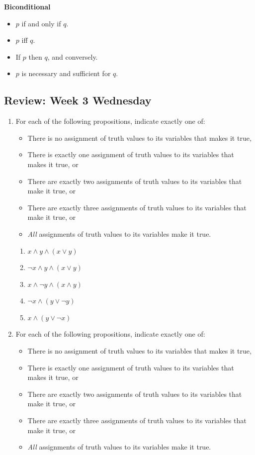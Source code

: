 \documentclass[12pt, oneside]{article}
\begin{document}
{\bf Biconditional}
\begin{itemize}
    \item $p$ if and only if $q$.
    \item $p$ iff $q$.
    \item If $p$ then $q$, and conversely.
    \item $p$ is necessary and sufficient for $q$.
\end{itemize} \newpage
\subsection*{Review: Week 3 Wednesday}
\begin{enumerate}
    \item 

For each of the following propositions, indicate exactly one of:

\begin{itemize}
    \item There is no assignment of truth values to its variables that makes it true,
    \item There is exactly one assignment of truth values to its variables that makes it true, or
    \item There are exactly two assignments of truth values to its variables that make it true, or
    \item There are exactly three assignments of truth values to its variables that make it true, or
    \item \emph{All} assignments of truth values to its variables make it true.
\end{itemize}

\begin{enumerate}
    \item $x \land y \land (x \lor y)$
    \item $\lnot x \land y \land (x \lor y)$
    \item $x \land \lnot y \land (x \land y)$
    \item $\lnot x \land (y \lor \lnot y)$
    \item $x \land (y \lor \lnot x)$
\end{enumerate}     \item 

For each of the following propositions, indicate exactly one of:

\begin{itemize}
    \item There is no assignment of truth values to its variables that makes it true,
    \item There is exactly one assignment of truth values to its variables that makes it true, or
    \item There are exactly two assignments of truth values to its variables that make it true, or
    \item There are exactly three assignments of truth values to its variables that make it true, or
    \item \emph{All} assignments of truth values to its variables make it true.
\end{itemize}


\end{enumerate}
\end{document}

